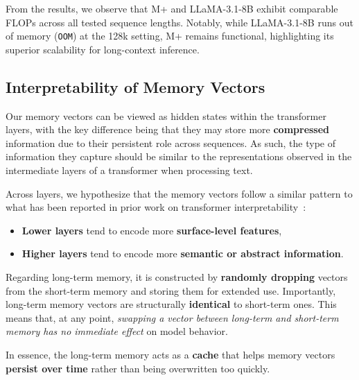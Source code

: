 From the results, we observe that M+ and LLaMA-3.1-8B exhibit comparable FLOPs across all tested sequence lengths. Notably, while LLaMA-3.1-8B runs out of memory (\texttt{OOM}) at the 128k setting, M+ remains functional, highlighting its superior scalability for long-context inference.


\subsection{Interpretability of Memory Vectors}
\label{sub:interpretability_of_memory_vectors}
Our memory vectors can be viewed as hidden states within the transformer layers, with the key difference being that they may store more \textbf{compressed} information due to their persistent role across sequences. As such, the type of information they capture should be similar to the representations observed in the intermediate layers of a transformer when processing text.

Across layers, we hypothesize that the memory vectors follow a similar pattern to what has been reported in prior work on transformer interpretability~\cite{jawahar2019does, simoulin2021many}:
\begin{itemize}
    \item \textbf{Lower layers} tend to encode more \textbf{surface-level features},
    \item \textbf{Higher layers} tend to encode more \textbf{semantic or abstract information}.
\end{itemize}

Regarding long-term memory, it is constructed by \textbf{randomly dropping} vectors from the short-term memory and storing them for extended use. Importantly, long-term memory vectors are structurally \textbf{identical} to short-term ones. This means that, at any point, \textit{swapping a vector between long-term and short-term memory has no immediate effect} on model behavior.

In essence, the long-term memory acts as a \textbf{cache} that helps memory vectors \textbf{persist over time} rather than being overwritten too quickly.


